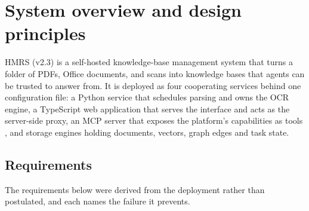 \section{System overview and design principles}
\label{sec:system}

HMRS (v2.3) is a self-hosted knowledge-base management system that turns a
folder of PDFs, Office documents, and scans into knowledge bases that agents
can be trusted to answer from. It is deployed as four cooperating services
behind one configuration file: a Python service that schedules parsing and
owns the OCR engine, a TypeScript web application that serves the interface
and acts as the server-side proxy, an MCP server that exposes the platform's
capabilities as tools \cite{mcp}, and storage engines holding documents,
vectors, graph edges and task state.

\subsection{Requirements}
\label{sec:req}

The requirements below were derived from the deployment rather than
postulated, and each names the failure it prevents.

